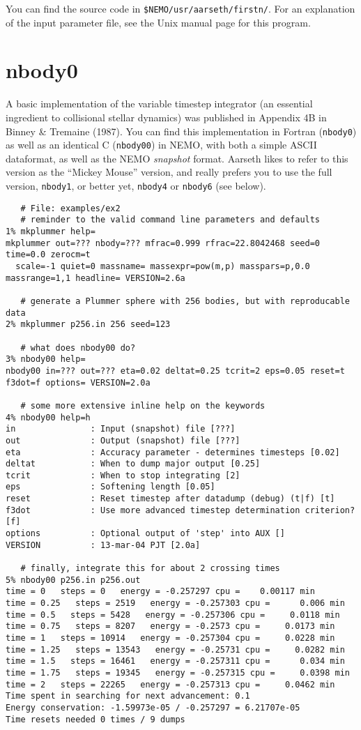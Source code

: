 {{You can find the source code in {\tt \$NEMO/usr/aarseth/firstn/}. For 
an explanation of the input parameter file, see the Unix manual
page for this program.

\section{nbody0}

A basic implementation of the variable timestep integrator (an essential ingredient
to collisional stellar dynamics) was published in Appendix 4B in
Binney \& Tremaine (1987). 
You can find this implementation in Fortran ({\tt nbody0})
as well as an identical C
({\tt nbody00}) in NEMO, with both a simple ASCII dataformat,
as well as the NEMO {\it snapshot} format. Aarseth likes
to refer to this version as the ``Mickey Mouse'' version, and really prefers
you to use the full version, {\tt nbody1}, or better yet,
{\tt nbody4} or {\tt nbody6} (see below).


\footnotesize\begin{verbatim}
   # File: examples/ex2
   # reminder to the valid command line parameters and defaults
1% mkplummer help=
mkplummer out=??? nbody=??? mfrac=0.999 rfrac=22.8042468 seed=0 time=0.0 zerocm=t 
  scale=-1 quiet=0 massname= massexpr=pow(m,p) masspars=p,0.0 massrange=1,1 headline= VERSION=2.6a

   # generate a Plummer sphere with 256 bodies, but with reproducable data
2% mkplummer p256.in 256 seed=123

   # what does nbody00 do?
3% nbody00 help=
nbody00 in=??? out=??? eta=0.02 deltat=0.25 tcrit=2 eps=0.05 reset=t f3dot=f options= VERSION=2.0a

   # some more extensive inline help on the keywords
4% nbody00 help=h
in               : Input (snapshot) file [???]
out              : Output (snapshot) file [???]
eta              : Accuracy parameter - determines timesteps [0.02]
deltat           : When to dump major output [0.25]
tcrit            : When to stop integrating [2]
eps              : Softening length [0.05]
reset            : Reset timestep after datadump (debug) (t|f) [t]
f3dot            : Use more advanced timestep determination criterion? [f]
options          : Optional output of 'step' into AUX []
VERSION          : 13-mar-04 PJT [2.0a]

   # finally, integrate this for about 2 crossing times
5% nbody00 p256.in p256.out
time = 0   steps = 0   energy = -0.257297 cpu =    0.00117 min
time = 0.25   steps = 2519   energy = -0.257303 cpu =      0.006 min
time = 0.5   steps = 5428   energy = -0.257306 cpu =     0.0118 min
time = 0.75   steps = 8207   energy = -0.2573 cpu =     0.0173 min
time = 1   steps = 10914   energy = -0.257304 cpu =     0.0228 min
time = 1.25   steps = 13543   energy = -0.25731 cpu =     0.0282 min
time = 1.5   steps = 16461   energy = -0.257311 cpu =      0.034 min
time = 1.75   steps = 19345   energy = -0.257315 cpu =     0.0398 min
time = 2   steps = 22265   energy = -0.257313 cpu =     0.0462 min
Time spent in searching for next advancement: 0.1
Energy conservation: -1.59973e-05 / -0.257297 = 6.21707e-05
Time resets needed 0 times / 9 dumps



\end{verbatim}}}
